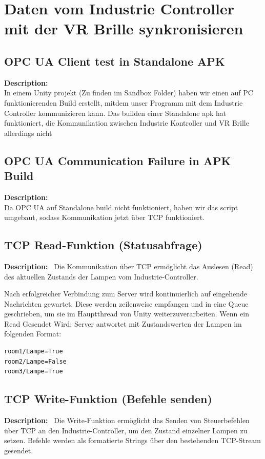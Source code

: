 \documentclass[]{article}
\begin{document}
 
\section{Daten vom Industrie Controller mit der VR Brille synkronisieren}
 
\subsection{OPC UA Client test in Standalone APK}
 
\textbf{Description:} \\
In einem  Unity projekt (Zu finden im Sandbox Folder) haben wir einen auf PC funktionierenden Build erstellt, mitdem unser Programm mit dem Industrie Controller kommunizieren kann. Das builden einer Standalone apk hat funktioniert, die Kommunikation zwischen Industrie Kontroller und VR Brille allerdings nicht
 
 
\subsection{OPC UA Communication Failure in APK Build}
 
\textbf{Description:} \\
Da OPC UA auf Standalone build nicht funktioniert, haben wir das script umgebaut, sodass Kommunikation jetzt über TCP funktioniert.
 
\subsection{TCP Read-Funktion (Statusabfrage)}
 
\textbf{Description:} \
Die Kommunikation über TCP ermöglicht das Auslesen (Read) des aktuellen Zustands der Lampen vom Industrie-Controller.
 
Nach erfolgreicher Verbindung zum Server wird kontinuierlich auf eingehende Nachrichten gewartet. Diese werden zeilenweise empfangen und in eine Queue geschrieben, um sie im Hauptthread von Unity weiterzuverarbeiten.
Wenn ein Read Gesendet Wird: Server antwortet mit Zustandswerten der Lampen im folgenden Format:
 
\begin{verbatim}
room1/Lampe=True
room2/Lampe=False
room3/Lampe=True
\end{verbatim}


\subsection{TCP Write-Funktion (Befehle senden)}
\textbf{Description:} \
Die Write-Funktion ermöglicht das Senden von Steuerbefehlen über TCP an den Industrie-Controller, um den Zustand einzelner Lampen zu setzen. Befehle werden als formatierte Strings über den bestehenden TCP-Stream gesendet.
\end{document}
